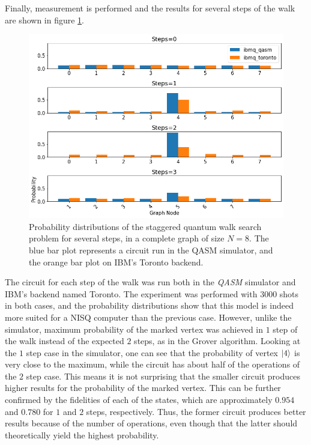 \documentclass[../../dissertation.tex]{subfiles}
\begin{document}
Finally, measurement is performed and the results for several steps of the walk
are shown in figure \ref{fig:stagSearchResultsToronto}.  
\begin{figure}[!h]
	\centering
	\includegraphics[scale=0.40]{img/Qiskit/StaggeredQW/Search/stagSearchToronto_N3_S0123.png}
	\caption{Probability distributions of the staggered quantum walk search problem for several steps, in a complete graph of size $N=8$. The blue bar plot represents a circuit run in the QASM simulator, and the orange bar plot on IBM's Toronto backend.}
	\label{fig:stagSearchResultsToronto}
\end{figure}
The circuit for each step of the walk was run both in the \textit{QASM}
simulator and IBM's backend named Toronto. The experiment was performed with
$3000$ shots in both cases, and the probability distributions show that this
model is indeed more suited for a NISQ computer than the previous case.
However, unlike the simulator, maximum probability of the marked vertex was
achieved in $1$ step of the walk instead of the expected $2$ steps, as in the Grover algorithm. Looking at the $1$ step case in the
simulator, one can see that the probability of vertex $\ket{4}$ is very close
to the maximum, while the circuit has about half of the operations of the $2$
step case. This means it is not surprising that the smaller circuit produces
higher results for the probability of the marked vertex. 
This can be further confirmed by the fidelities of each of the states, which
are approximately $0.954$ and $0.780$ for $1$ and $2$ steps, respectively. Thus, the former circuit produces better results because of the number
of operations, even though that the latter should theoretically yield the
highest probability.\par 
\end{document}
